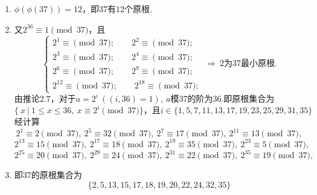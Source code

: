 \documentclass[UTF8]{ctexart}
\begin{document}
\subsection{}   %
\begin{enumerate}
    \item []$\phi(\phi(37))=12$，即$37$有$12$个原根.
    \item []又$2^{36}\equiv 1\pmod{37}$，且
    \[ 
        \begin{cases}
            2^{1}  \equiv  \pmod{37};   
            \qquad    
            2^{2}  \equiv  \pmod{37};\\
            2^{3}  \equiv  \pmod{37};
            \qquad
            2^{4}  \equiv  \pmod{37};\\
            2^{6}  \equiv  \pmod{37};
            \qquad
            2^{9}  \equiv  \pmod{37};\\
            2^{12} \equiv  \pmod{37};    
            \qquad
            2^{18} \equiv  \pmod{37};
        \end{cases}
        \ \Rightarrow\ 
        2\mbox{为} 37\mbox{最小原根}.
    \]
    由推论$2.7$，对于$a=2^{i}\ ((i,36)=1),\ a$模$37$的阶为$36$.即原根集合为
    \[
        \{
            \ x\  |\  1\leq x\leq 36,\ x\equiv 2^{i} \pmod{37} 
        \}
        \mbox{，且}
        i\in
        \{
            1,5,7,11,13,17,19,23,25,29,31,35
        \}
    \]
    经计算
    \[
        2^{1 } \equiv 2  \pmod{37},\             
        2^{5 } \equiv 32 \pmod{37},\         
        2^{7 } \equiv 17 \pmod{37},\         
        2^{11} \equiv 13 \pmod{37},   
    \]
    \[
        2^{13} \equiv 15 \pmod{37},\         
        2^{17} \equiv 18 \pmod{37},\         
        2^{19} \equiv 35 \pmod{37},\         
        2^{23} \equiv 5  \pmod{37},
    \]
    \[
        2^{25} \equiv 20 \pmod{37},\         
        2^{29} \equiv 24 \pmod{37},\         
        2^{31} \equiv 22 \pmod{37},\         
        2^{35} \equiv 19 \pmod{37},
    \]
    \item []即37的原根集合为
    \[
        \{
            2,5,13,15,17,18,19,20,22,24,32,35    
        \}
    \]
\end{enumerate}
\end{document}
